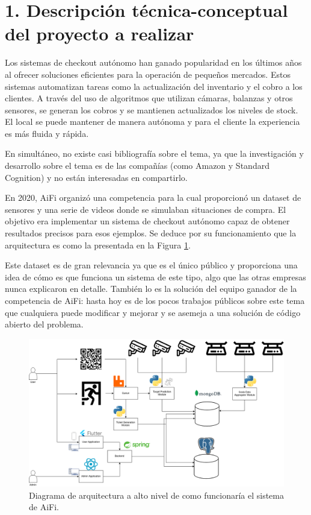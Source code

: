 \documentclass[
11pt, %
codirector, %
]{charter}
\begin{document}
\section{1. Descripción técnica-conceptual del proyecto a realizar}
\label{sec:descripcion}

Los sistemas de checkout autónomo han ganado popularidad en los últimos años al ofrecer soluciones eficientes para la operación de pequeños mercados. Estos sistemas automatizan tareas como la actualización del inventario y el cobro a los clientes. A través del uso de algoritmos que utilizan cámaras, balanzas y otros sensores, se generan los cobros y se mantienen actualizados los niveles de stock. El local se puede mantener de manera autónoma y para el cliente la experiencia es más fluida y rápida.

En simultáneo, no existe casi bibliografía sobre el tema, ya que la investigación y desarrollo sobre el tema es de las compañías (como Amazon y Standard Cognition) y no están interesadas en compartirlo.

En 2020, AiFi organizó una competencia para la cual proporcionó un dataset de sensores y una serie de videos donde se simulaban situaciones de compra. El objetivo era implementar un sistema de checkout autónomo capaz de obtener resultados precisos para esos ejemplos. Se deduce por su funcionamiento que la arquitectura es como la presentada en la Figura \ref{fig:arqAifi}.

Este dataset es de gran relevancia ya que es el único público y proporciona una idea de cómo es que funciona un sistema de este tipo, algo que las otras empresas nunca explicaron en detalle. También lo es la solución del equipo ganador de la competencia de AiFi: hasta hoy es de los pocos trabajos públicos sobre este tema que cualquiera puede modificar y mejorar y se asemeja a una solución de código abierto del problema.

\begin{figure}[htpb]
\centering 
\includegraphics[width=1.05\textwidth]{./Figuras/Arquitectura TDG-Arch proposal.drawio.png}
\caption{Diagrama de arquitectura a alto nivel de como funcionaría el sistema de AiFi.}
\label{fig:arqAifi}
\end{figure}
\end{document}
